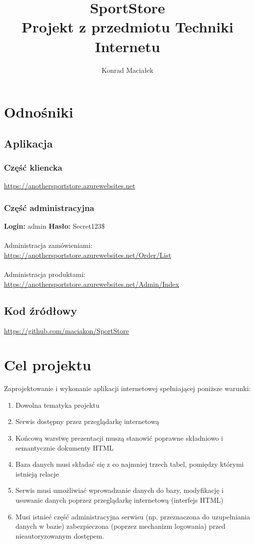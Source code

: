 \documentclass[a4paper,10pt]{article}
\title{
SportStore \\
\large Projekt z przedmiotu Techniki Internetu}
\author{Konrad Maciałek}
\begin{document}
\maketitle
\newpage
\tableofcontents
\newpage
\section{Odnośniki}
\subsection{Aplikacja}
\subsubsection{Część kliencka}
\url{https://anothersportstore.azurewebsites.net}
\subsubsection{Część administracyjna}
\textbf{Login:} admin
\newline \indent
\textbf{Hasło:} Secret123\$
\paragraph{}
Administracja zamówieniami:
\newline
\indent \url{https://anothersportstore.azurewebsites.net/Order/List}
\paragraph{}
Administracja produktami:
\newline 
\indent \url{https://anothersportstore.azurewebsites.net/Admin/Index}
\newline
\subsection{Kod źródłowy}
\url {https://github.com/maciakon/SportStore}
\section{Cel projektu}
Zaprojektowanie i wykonanie aplikacji internetowej spełniającej poniższe warunki:
\begin{enumerate}
 \item Dowolna tematyka projektu
 \item Serwis dostępny przez przeglądarkę internetową
 \item Końcową warstwę prezentacji muszą stanowić poprawne składniowo i semantycznie dokumenty HTML
 \item Baza danych musi składać się z co najmniej trzech tabel, pomiędzy którymi istnieją relacje
 \item Serwis musi umożliwiać wprowadzanie danych do bazy, modyfikację i usuwanie danych poprzez przeglądarkę internetową (interfejs HTML)
 \item Musi istnieć część administracyjna serwisu (np. przeznaczona do uzupełniania danych w bazie) zabezpieczona (poprzez mechanizm logowania) przed nieautoryzowanym dostępem.
\end{enumerate}
\end{document}

